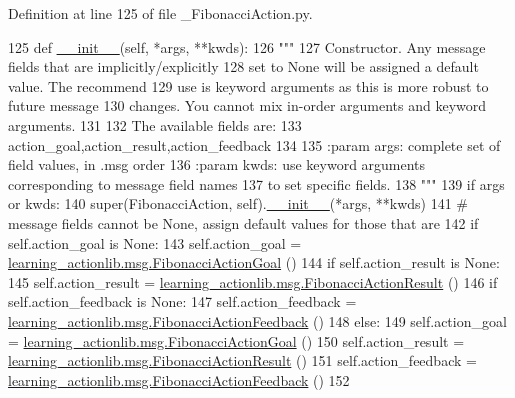 Definition at line 125 of file \+\_\+\+Fibonacci\+Action.\+py.


\begin{DoxyCode}
125   \textcolor{keyword}{def }\hyperlink{classstate__machine_1_1Play_a5993a23d8be7f7b2647f71ede0334957}{\_\_init\_\_}(self, *args, **kwds):
126     \textcolor{stringliteral}{"""}
127 \textcolor{stringliteral}{    Constructor. Any message fields that are implicitly/explicitly}
128 \textcolor{stringliteral}{    set to None will be assigned a default value. The recommend}
129 \textcolor{stringliteral}{    use is keyword arguments as this is more robust to future message}
130 \textcolor{stringliteral}{    changes.  You cannot mix in-order arguments and keyword arguments.}
131 \textcolor{stringliteral}{}
132 \textcolor{stringliteral}{    The available fields are:}
133 \textcolor{stringliteral}{       action\_goal,action\_result,action\_feedback}
134 \textcolor{stringliteral}{}
135 \textcolor{stringliteral}{    :param args: complete set of field values, in .msg order}
136 \textcolor{stringliteral}{    :param kwds: use keyword arguments corresponding to message field names}
137 \textcolor{stringliteral}{    to set specific fields.}
138 \textcolor{stringliteral}{    """}
139     \textcolor{keywordflow}{if} args \textcolor{keywordflow}{or} kwds:
140       super(FibonacciAction, self).\hyperlink{classstate__machine_1_1Play_a5993a23d8be7f7b2647f71ede0334957}{\_\_init\_\_}(*args, **kwds)
141       \textcolor{comment}{# message fields cannot be None, assign default values for those that are}
142       \textcolor{keywordflow}{if} self.action\_goal \textcolor{keywordflow}{is} \textcolor{keywordtype}{None}:
143         self.action\_goal = \hyperlink{classlearning__actionlib_1_1msg_1_1__FibonacciActionGoal_1_1FibonacciActionGoal}{learning\_actionlib.msg.FibonacciActionGoal}
      ()
144       \textcolor{keywordflow}{if} self.action\_result \textcolor{keywordflow}{is} \textcolor{keywordtype}{None}:
145         self.action\_result = \hyperlink{classlearning__actionlib_1_1msg_1_1__FibonacciActionResult_1_1FibonacciActionResult}{learning\_actionlib.msg.FibonacciActionResult}
      ()
146       \textcolor{keywordflow}{if} self.action\_feedback \textcolor{keywordflow}{is} \textcolor{keywordtype}{None}:
147         self.action\_feedback = \hyperlink{classlearning__actionlib_1_1msg_1_1__FibonacciActionFeedback_1_1FibonacciActionFeedback}{learning\_actionlib.msg.FibonacciActionFeedback}
      ()
148     \textcolor{keywordflow}{else}:
149       self.action\_goal = \hyperlink{classlearning__actionlib_1_1msg_1_1__FibonacciActionGoal_1_1FibonacciActionGoal}{learning\_actionlib.msg.FibonacciActionGoal}
      ()
150       self.action\_result = \hyperlink{classlearning__actionlib_1_1msg_1_1__FibonacciActionResult_1_1FibonacciActionResult}{learning\_actionlib.msg.FibonacciActionResult}
      ()
151       self.action\_feedback = \hyperlink{classlearning__actionlib_1_1msg_1_1__FibonacciActionFeedback_1_1FibonacciActionFeedback}{learning\_actionlib.msg.FibonacciActionFeedback}
      ()
152 
\end{DoxyCode}


